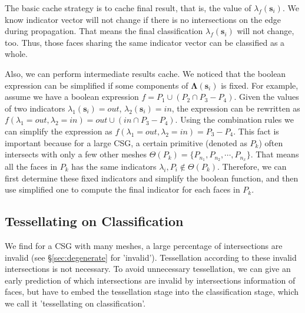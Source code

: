 \documentclass[10pt,journal,compsoc]{IEEEtran}
\begin{document}
The basic cache strategy is to cache final result, that is, the value of $\lambda_f(\bm{s}_i)$. We know indicator vector will not change if there is no intersections on the edge during propagation. That means the final classification $\lambda_f(\bm{s}_i)$ will not change, too. Thus, those faces sharing the same indicator vector can be classified as a whole.

Also, we can perform intermediate results cache. We noticed that the boolean expression can be simplified if some components of $\boldsymbol{\Lambda}(\bm{s}_i)$ is fixed. For example, assume we have a boolean expression $f = P_1\cup (P_2\cap P_3-P_4)$. Given the values of two indicators $\lambda_1(\bm{s}_i)=out$, $\lambda_2(\bm{s}_i)=in$, the expression can be rewritten as $f(\lambda_1=out, \lambda_2=in)=out\cup (in\cap P_3-P_4)$. Using the combination rules we can simplify the expression as $f(\lambda_1=out, \lambda_2=in)=P_3-P_4$. This fact is important because for a large CSG, a certain primitive (denoted as $P_k$) often intersects with only a few other meshes $\Theta(P_k)= \{P_{n_1}, P_{n_2}, \cdots, P_{n_x}\}$. That means all the faces in $P_k$ has the same indicators $\lambda_{i}, P_{i} \notin \Theta(P_k)$. Therefore, we can first determine these fixed indicators and simplify the boolean function, and then use simplified one to compute the final indicator for each faces in $P_k$.



\iffalse
\subsection{Tessellating on Classification}
We find for a CSG with many meshes, a large percentage of intersections are invalid (see \S\ref{sec:degenerate} for 'invalid'). Tessellation according to these invalid intersections is not necessary. To avoid unnecessary tessellation, we can give an early prediction of which intersections are invalid by intersections information of faces, but have to embed the tessellation stage into the classification stage, which we call it 'tessellating on classification'.
\end{document}

